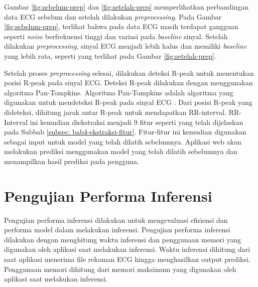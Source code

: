 Gambar \ref{fig:sebelum-prep} dan \ref{fig:setelah-prep} memperlihatkan perbandingan data ECG sebelum dan setelah dilakukan \textit{preprocessing}.
Pada Gambar \ref{fig:sebelum-prep}, terlihat bahwa pada data ECG masih terdapat gangguan seperti \textit{noise} berfrekuensi tinggi dan variasi pada \textit{baseline} sinyal.
Setelah dilakukan \textit{preprocessing}, sinyal ECG menjadi lebih halus dan memiliki \textit{baseline} yang lebih rata, seperti yang terlihat pada Gambar \ref{fig:setelah-prep}.


Setelah proses \textit{preprocessing} selesai, dilakukan deteksi R-peak untuk menentukan posisi R-peak pada sinyal ECG.
Deteksi R-peak dilakukan dengan menggunakan algoritma Pan-Tompkins.
Algoritma Pan-Tompkins adalah algoritma yang digunakan untuk mendeteksi R-peak pada sinyal ECG \parencite{panRealtimeQRSDetection1985}.
Dari posisi R-peak yang dideteksi, dihitung jarak antar R-peak untuk mendapatkan RR-interval.
RR-Interval ini kemudian diekstraksi menjadi 9 fitur seperti yang telah dijelaskan pada Subbab \ref{subsec: bab4-ekstraksi-fitur}.
Fitur-fitur ini kemudian digunakan sebagai input untuk model yang telah dilatih sebelumnya.
Aplikasi web akan melakukan prediksi menggunakan model yang telah dilatih sebelumnya dan menampilkan hasil prediksi pada pengguna.


\section{Pengujian Performa Inferensi}
Pengujian performa inferensi dilakukan untuk mengevaluasi efisiensi dan performa model dalam melakukan inferensi.
Pengujian performa inferensi dilakukan dengan menghitung waktu inferensi dan penggunaan memori yang digunakan oleh aplikasi saat melakukan inferensi.
Waktu inferensi dihitung dari saat aplikasi menerima file rekaman ECG hingga menghasilkan output prediksi.
Penggunaan memori dihitung dari memori maksimum yang digunakan oleh aplikasi saat melakukan inferensi.

